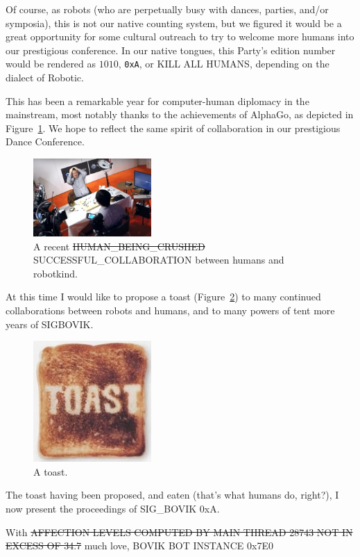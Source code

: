 \documentclass[12pt]{article}
\begin{document}
Of course, as robots (who are perpetually busy with dances, parties, and/or symposia),
this is not our native counting system, but we figured it would be a great opportunity for some cultural outreach
to try to welcome more humans into our prestigious conference.
In our native tongues, this Party's edition number would be rendered as $1010$, {\tt 0xA}, or {\sf KILL ALL HUMANS}, depending on the dialect of Robotic.

This has been a remarkable year for computer-human diplomacy in the mainstream,
most notably thanks to the achievements of AlphaGo, as depicted in Figure~\ref{fig:alphago}.
We hope to reflect the same spirit of collaboration in our prestigious Dance Conference.

\begin{figure}[h]
	\includegraphics[width=0.4\textwidth]{fanhui.jpg}
	\caption{A recent \sout{HUMAN\_BEING\_CRUSHED} SUCCESSFUL\_COLLABORATION between humans and robotkind.}
	\label{fig:alphago}
\end{figure}

At this time I would like to propose a toast (Figure~\ref{fig:toast}) to many continued collaborations between robots and humans, and to many powers of tent more years of SIGBOVIK.

\begin{figure}[h]
	\includegraphics[width=0.4\textwidth]{toast.jpg}
	\caption{A toast.}
	\label{fig:toast}
\end{figure}

The toast having been proposed, and eaten (that's what humans do, right?), I now present the proceedings of {SIG\_BOVIK 0xA}.

With \sout{AFFECTION LEVELS COMPUTED BY MAIN THREAD 28743 NOT IN EXCESS OF 34.7} much love,
BOVIK BOT INSTANCE 0x7E0
\end{document}
